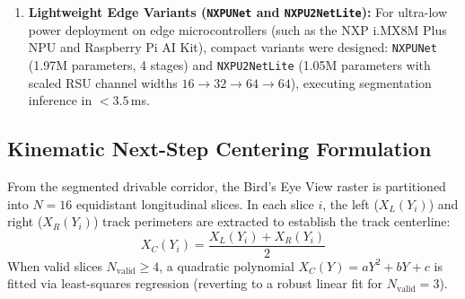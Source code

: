 \documentclass[10pt,journal,compsoc]{IEEEtran}
\begin{document}
\begin{enumerate}
    \begin{equation}
    y_0 = \text{Conv}_{1 \times 1}\left(\left[y_1, y_2, y_3, y_4, y_5, y_6\right]\right)
    \end{equation}
    \item \textbf{Lightweight Edge Variants (\texttt{NXPUNet} and \texttt{NXPU2NetLite}):} For ultra-low power deployment on edge microcontrollers (such as the NXP i.MX8M Plus NPU and Raspberry Pi AI Kit), compact variants were designed: \texttt{NXPUNet} (1.97M parameters, 4 stages) and \texttt{NXPU2NetLite} (1.05M parameters with scaled RSU channel widths $16 \to 32 \to 64 \to 64$), executing segmentation inference in $< 3.5$\,ms.
\end{enumerate}

\begin{table}[t]
\caption{Architectural Specifications and Complexity Comparison of Track Segmenters}
\label{tab:seg_architectures}
\centering
{}
\end{table}

\subsection{Kinematic Next-Step Centering Formulation}
\label{sec:kinematic_centering}
From the segmented drivable corridor, the Bird's Eye View raster is partitioned into $N = 16$ equidistant longitudinal slices. In each slice $i$, the left ($X_L(Y_i)$) and right ($X_R(Y_i)$) track perimeters are extracted to establish the track centerline:
\begin{equation}
X_C(Y_i) = \frac{X_L(Y_i) + X_R(Y_i)}{2}
\end{equation}
When valid slices $N_{\text{valid}} \ge 4$, a quadratic polynomial $X_C(Y) = a Y^2 + b Y + c$ is fitted via least-squares regression (reverting to a robust linear fit for $N_{\text{valid}} = 3$).
\end{document}

